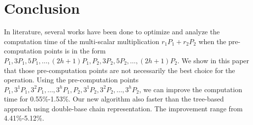 \section{Conclusion}

In literature, several works have been done to optimize and analyze the computation time of the multi-scalar multiplication $r_1P_1 + r_2P_2$ when the pre-computation points is in the form $P_1, 3P_1, 5P_1, \dots, (2h + 1)P_1, P_2, 3P_2, 5P_2, \dots, (2h + 1)P_2$. We show in this paper that those pre-computation points are not necessarily the best choice for the operation. Using the pre-computation points $P_1, 3^1P_1, 3^2P_1, \dots, 3^hP_1, P_2, 3^1P_2, 3^2P_2, \dots, 3^hP_2$,
we can improve the computation time for 0.55\%-1.53\%.
Our new algorithm also faster than the tree-based approach using double-base chain representation.
The improvement range from 4.41\%-5.12\%.






